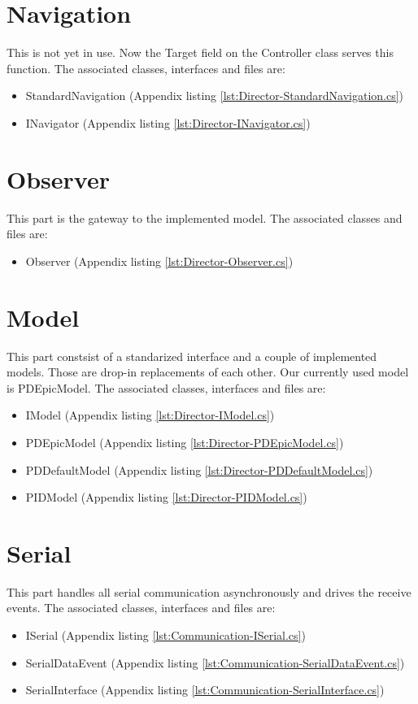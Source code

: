 \documentclass[final]{scrreprt} %
\begin{document}
\section{Navigation}
This is not yet in use. Now the Target field on the Controller class serves this function.
The associated classes, interfaces and files are:
\begin{itemize}
\item StandardNavigation (Appendix listing \ref{lst:Director-StandardNavigation.cs})
\item INavigator (Appendix listing \ref{lst:Director-INavigator.cs})
\end{itemize}
\section{Observer}
This part is the gateway to the implemented model.
The associated classes and files are:
\begin{itemize}
\item Observer (Appendix listing \ref{lst:Director-Observer.cs})
\end{itemize}
\section{Model}
This part constsist of a standarized interface and a couple of implemented models.
Those are drop-in replacements of each other.
Our currently used model is PDEpicModel.
The associated classes, interfaces and files are:
\begin{itemize}
\item IModel (Appendix listing \ref{lst:Director-IModel.cs})
\item PDEpicModel (Appendix listing \ref{lst:Director-PDEpicModel.cs})
\item PDDefaultModel (Appendix listing \ref{lst:Director-PDDefaultModel.cs})
\item PIDModel (Appendix listing \ref{lst:Director-PIDModel.cs})
\end{itemize}
\section{Serial}
This part handles all serial communication asynchronously and drives the receive events.
The associated classes, interfaces and files are:
\begin{itemize}
\item ISerial (Appendix listing \ref{lst:Communication-ISerial.cs})
\item SerialDataEvent (Appendix listing \ref{lst:Communication-SerialDataEvent.cs})
\item SerialInterface (Appendix listing \ref{lst:Communication-SerialInterface.cs})
\end{itemize}
\end{document}
